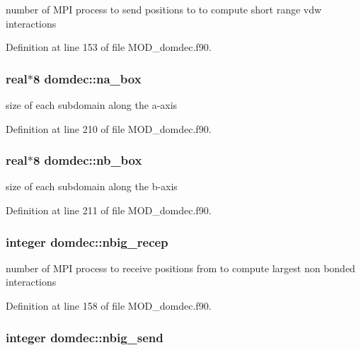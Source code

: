 number of M\-P\-I process to send positions to to compute short range vdw interactions 



Definition at line 153 of file M\-O\-D\-\_\-domdec.\-f90.

\hypertarget{classdomdec_a6fbb2670015481430ce47e763a530408}{
\subsubsection[{na\-\_\-box}]{\setlength{\rightskip}{0pt plus 5cm}real$\ast$8 domdec\-::na\-\_\-box}}\label{classdomdec_a6fbb2670015481430ce47e763a530408}


size of each subdomain along the a-\/axis 



Definition at line 210 of file M\-O\-D\-\_\-domdec.\-f90.

\hypertarget{classdomdec_a8f096ca3b8d296c40a28eb015490f11c}{
\subsubsection[{nb\-\_\-box}]{\setlength{\rightskip}{0pt plus 5cm}real$\ast$8 domdec\-::nb\-\_\-box}}\label{classdomdec_a8f096ca3b8d296c40a28eb015490f11c}


size of each subdomain along the b-\/axis 



Definition at line 211 of file M\-O\-D\-\_\-domdec.\-f90.

\hypertarget{classdomdec_ab07069ab2af1699dc506c4cd10c24a83}{
\subsubsection[{nbig\-\_\-recep}]{\setlength{\rightskip}{0pt plus 5cm}integer domdec\-::nbig\-\_\-recep}}\label{classdomdec_ab07069ab2af1699dc506c4cd10c24a83}


number of M\-P\-I process to receive positions from to compute largest non bonded interactions 



Definition at line 158 of file M\-O\-D\-\_\-domdec.\-f90.

\hypertarget{classdomdec_a259cec691f627989c92b56e625e5dc79}{
\subsubsection[{nbig\-\_\-send}]{\setlength{\rightskip}{0pt plus 5cm}integer domdec\-::nbig\-\_\-send}}\label{classdomdec_a259cec691f627989c92b56e625e5dc79}


